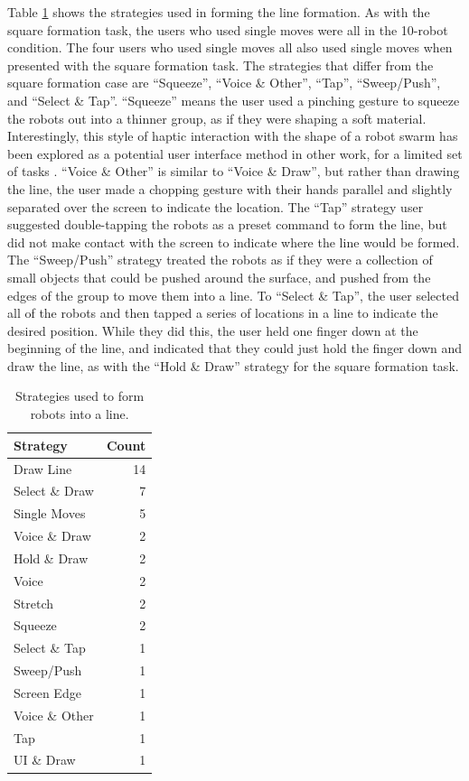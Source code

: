 Table \ref{tab:line_strategies} shows the strategies used in forming the line formation. 
As with the square formation task, the users who used single moves were all in the 10-robot condition. 
The four users who used single moves all also used single moves when presented with the square formation task. 
The strategies that differ from the square formation case are ``Squeeze'', ``Voice \& Other'', ``Tap'', ``Sweep/Push'', and ``Select \& Tap''. 
``Squeeze'' means the user used a pinching gesture to squeeze the robots out into a thinner group, as if they were shaping a soft material. 
Interestingly, this style of haptic interaction with the shape of a robot swarm has been explored as a potential user interface method in other work, for a limited set of tasks \citep{mcdonald2017haptic}.
``Voice \& Other'' is similar to ``Voice \& Draw'', but rather than drawing the line, the user made a chopping gesture with their hands parallel and slightly separated over the screen to indicate the location. 
The ``Tap'' strategy user suggested double-tapping the robots as a preset command to form the line, but did not make contact with the screen to indicate where the line would be formed. 
The ``Sweep/Push'' strategy treated the robots as if they were a collection of small objects that could be pushed around the surface, and pushed from the edges of the group to move them into a line. 
To ``Select \& Tap'', the user selected all of the robots and then tapped a series of locations in a line to indicate the desired position.
While they did this, the user held one finger down at the beginning of the line, and indicated that they could just hold the finger down and draw the line, as with the ``Hold \& Draw'' strategy for the square formation task. 

\begin{table}
	\centering
	\begin{tabular}{l r}
		Strategy & Count\\
		\hline
		Draw Line & 14\\
		Select \& Draw & 7\\
		Single Moves & 5\\
		Voice \& Draw & 2\\
		Hold \& Draw & 2\\
		Voice & 2\\
		Stretch & 2\\
		Squeeze & 2\\
		Select \& Tap & 1 \\
		Sweep/Push & 1\\
		Screen Edge & 1\\
		Voice \& Other & 1\\
		Tap & 1 \\
		UI \& Draw & 1\\
	\end{tabular}
	\caption{Strategies used to form robots into a line.}
	\label{tab:line_strategies}
\end{table}

